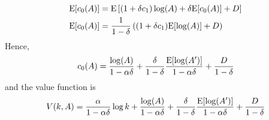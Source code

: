 \begin{example}
  \begin{align*}
    \mathrm{E}[c_0(A)] & = \mathrm{E}\left[(1+\delta c_1) \log(A) + \delta \mathrm{E}[c_0(A)]
                  + D \right] \\
    \mathrm{E}[c_0(A)] & = \frac{1}{1-\delta} \left( (1+\delta c_1)
                  \mathrm{E}[\log(A)] + D \right) 
  \end{align*}
  Hence,
  \[ c_0(A) = \frac{\log(A)}{1-\alpha \delta} +
    \frac{\delta}{1-\delta} \frac{\mathrm{E}[\log(A')]}{1-\alpha \delta} +
    \frac{D}{1-\delta} \]
  and the value function is
  \begin{align*}
    V(k,A) = \frac{\alpha}{1-\alpha \delta} \log k + \frac{\log(A)}{1-\alpha \delta} +
    \frac{\delta}{1-\delta} \frac{\mathrm{E}[\log(A')]}{1-\alpha \delta} +
    \frac{D}{1-\delta} 
  \end{align*}
\end{example}


\clearpage




